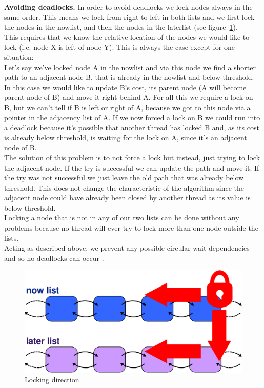 \documentclass[letterpaper]{article}
\newcommand{\mypar}[1]{{\bf #1.}}
\begin{document}
\mypar{Avoiding deadlocks}
In order to avoid deadlocks we lock nodes always in the same order. This means we lock from right to left in both lists and we first lock the nodes in the nowlist, and then the nodes in the laterlist (see figure~\ref{fig:lock}).\\
This requires that we know the relative location of the nodes we would like to lock (i.e. node X is left of node Y). This is always the case except for one situation:\\
Let's say we've locked node A in the nowlist and via this node we find a shorter path to an adjacent node B, that is already in the nowlist and below threshold. In this case we would like to update B's cost, its parent node (A will become parent node of B) and move it right behind A. For all this we require a lock on B, but we can't tell if B is left or right of A, because we got to this node via a pointer in the adjacency list of A. If we now forced a lock on B we could run into a deadlock because it's possible that another thread has locked B and, as its cost is already below threshold, is waiting for the lock on A, since it's an adjacent node of B.\\
The solution of this problem is to not force a lock but instead, just trying to lock the adjacent node. If the try is successful we can update the path and move it. If the try was not successful we just leave the old path that was already below threshold. This does not change the characteristic of the algorithm since the adjacent node could have already been closed by another thread as its value is below threshold. \\
Locking a node that is not in any of our two lists can be done without any problems because no thread will ever try to lock more than one node outside the lists.\\
Acting as described above, we prevent any possible circular wait dependencies and so no deadlocks can occur \cite{Coffman:71}.

\begin{figure}[h]\centering
  \includegraphics[scale=0.38]{locking.eps}
  \caption{Locking direction \label{fig:lock}}
\end{figure}
\end{document}
